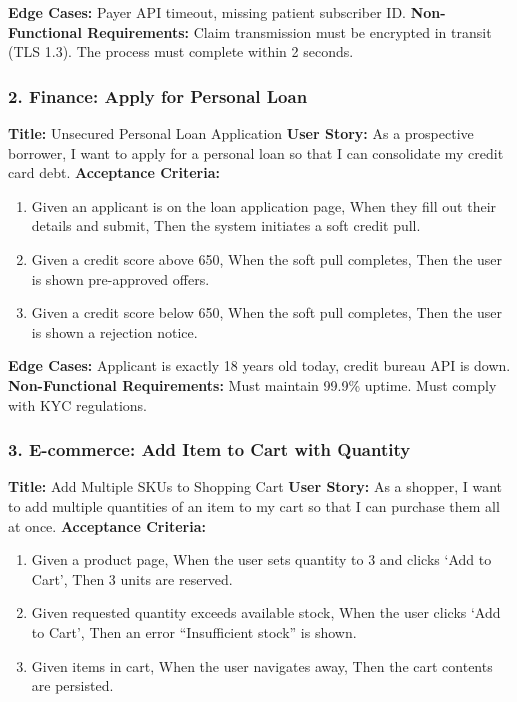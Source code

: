 \textbf{Edge Cases:} Payer API timeout, missing patient subscriber ID.
\textbf{Non-Functional Requirements:} Claim transmission must be
encrypted in transit (TLS 1.3). The process must complete within 2
seconds.

\subsubsection{2. Finance: Apply for Personal
Loan}\label{finance-apply-for-personal-loan}

\textbf{Title:} Unsecured Personal Loan Application \textbf{User Story:}
As a prospective borrower, I want to apply for a personal loan so that I
can consolidate my credit card debt. \textbf{Acceptance Criteria:}

\begin{enumerate}
\def\labelenumi{\arabic{enumi}.}
\tightlist
\item
  Given an applicant is on the loan application page, When they fill out
  their details and submit, Then the system initiates a soft credit
  pull.
\item
  Given a credit score above 650, When the soft pull completes, Then the
  user is shown pre-approved offers.
\item
  Given a credit score below 650, When the soft pull completes, Then the
  user is shown a rejection notice.
\end{enumerate}

\textbf{Edge Cases:} Applicant is exactly 18 years old today, credit
bureau API is down. \textbf{Non-Functional Requirements:} Must maintain
99.9\% uptime. Must comply with KYC regulations.

\subsubsection{3. E-commerce: Add Item to Cart with
Quantity}\label{e-commerce-add-item-to-cart-with-quantity}

\textbf{Title:} Add Multiple SKUs to Shopping Cart \textbf{User Story:}
As a shopper, I want to add multiple quantities of an item to my cart so
that I can purchase them all at once. \textbf{Acceptance Criteria:}

\begin{enumerate}
\def\labelenumi{\arabic{enumi}.}
\tightlist
\item
  Given a product page, When the user sets quantity to 3 and clicks `Add
  to Cart', Then 3 units are reserved.
\item
  Given requested quantity exceeds available stock, When the user clicks
  `Add to Cart', Then an error ``Insufficient stock'' is shown.
\item
  Given items in cart, When the user navigates away, Then the cart
  contents are persisted.
\end{enumerate}

